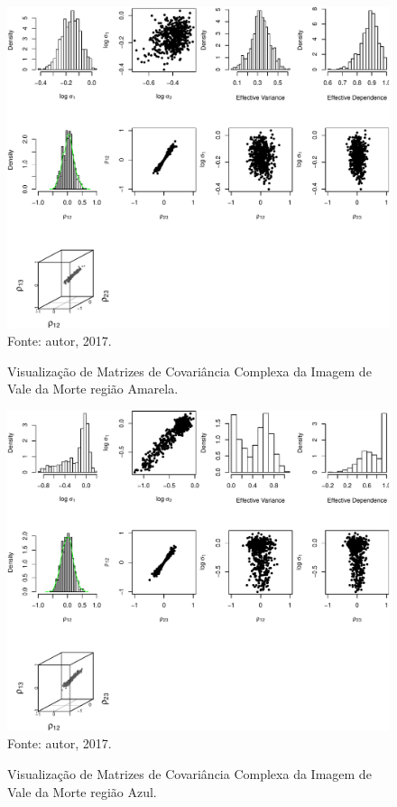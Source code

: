 \documentclass[journal]{IEEEtran}
\begin{document}
\newpage


\begin{figure}[ht]
\centering
\caption{Visualização de Matrizes de Covariância Complexa da Imagem de Vale da Morte região Amarela.}
\includegraphics[width=\linewidth]{../../Figuras/Amostras-Death/Death-Amarela-500.pdf}\\
Fonte: autor, 2017.
\label{visDeath1}
\end{figure}

\newpage

\begin{figure}[ht]
\centering
\caption{Visualização de Matrizes de Covariância Complexa da Imagem de Vale da Morte região Azul.}
\includegraphics[width=\linewidth]{../../Figuras/Amostras-Death/Death-Azul-500.pdf}\\
Fonte: autor, 2017.
\label{visDeath2}
\end{figure}
\end{document}
